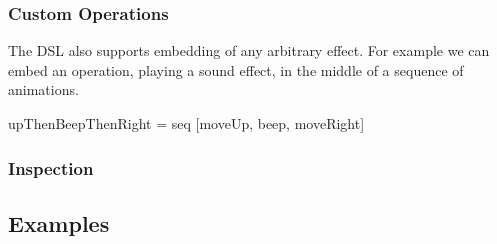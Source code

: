 \subsubsection{Custom Operations}


The DSL also supports embedding of any arbitrary effect. For example we can embed an  operation, playing a sound effect, in the middle of a sequence of animations.
\begin{code}
upThenBeepThenRight = seq [moveUp, beep, moveRight]
\end{code}


\subsubsection{Inspection}


\subsection{Examples}

